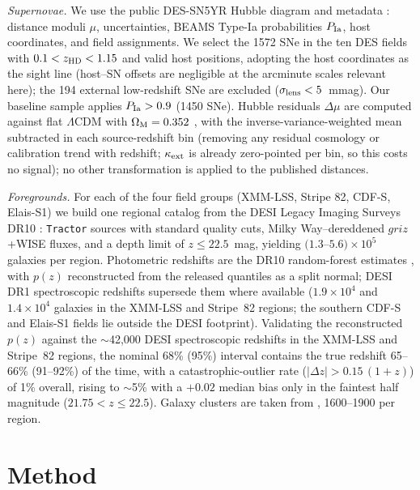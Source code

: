 \documentclass[twocolumn]{aastex701}
\newcommand{\kext}{\kappa_{\rm ext}}
\newcommand{\dmu}{\Delta\mu}
\begin{document}
\emph{Supernovae.} We use the public DES-SN5YR Hubble diagram and
metadata \citep{Abbott2024,Sanchez2024,Vincenzi2024}: distance moduli
$\mu$, uncertainties, BEAMS Type-Ia probabilities $P_{\rm Ia}$, host
coordinates, and field assignments. We select the 1572 SNe in the ten DES
fields with $0.1 < z_{\rm HD} < 1.15$ and valid host positions, adopting
the host coordinates as the sight line (host--SN offsets are negligible at
the arcminute scales relevant here); the 194 external low-redshift SNe
are excluded ($\sigma_{\rm lens} < 5$~mmag). Our baseline sample applies
$P_{\rm Ia} > 0.9$ (1450 SNe). Hubble residuals $\dmu$ are computed
against flat $\Lambda$CDM with $\Omega_{\rm M}=0.352$ \citep[the
DES-SN5YR SN-only fit, also adopted for the convergence
prediction;][]{Abbott2024}, with the inverse-variance-weighted mean
subtracted in each source-redshift bin (removing any residual
cosmology or calibration trend with redshift; $\kext$ is already
zero-pointed per bin, so this costs no signal); no other transformation
is applied to the published distances.

\emph{Foregrounds.} For each of the four field groups (XMM-LSS, Stripe
82, CDF-S, Elais-S1) we build one regional catalog from the DESI Legacy
Imaging Surveys DR10 \citep{Dey2019}: \texttt{Tractor} sources with
standard quality cuts, Milky Way--dereddened $griz$+WISE fluxes, and a
depth limit of $z \le 22.5$~mag, yielding $(1.3$--$5.6)\times10^5$
galaxies per region. Photometric redshifts are the DR10 random-forest
estimates \citep{Zhou2021}, with $p(z)$ reconstructed from the released
quantiles as a split normal; DESI DR1 spectroscopic redshifts
\citep{DESI2025} supersede them where available ($1.9\times10^4$ and
$1.4\times10^4$ galaxies in the XMM-LSS and Stripe~82 regions; the
southern CDF-S and Elais-S1 fields lie outside the DESI footprint).
Validating the reconstructed $p(z)$ against the $\sim$42{,}000 DESI
spectroscopic redshifts in the XMM-LSS and Stripe~82 regions, the
nominal 68\% (95\%) interval contains the true redshift 65--66\%
(91--92\%) of the time, with a catastrophic-outlier rate
($|\Delta z| > 0.15\,(1+z)$) of 1\% overall, rising to $\sim$5\% with a
$+0.02$ median bias only in the faintest half magnitude
($21.75 < z \le 22.5$). Galaxy clusters are taken from
\citet{WenHan2024}, 1600--1900 per region.

\section{Method}\label{sec:method}
\end{document}
